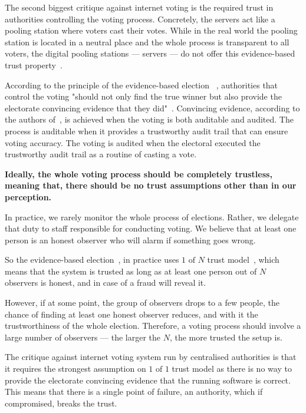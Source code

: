 \documentclass{article}
\begin{document}
The second biggest critique against internet voting is the required trust in authorities controlling the voting process. Concretely, the servers act like a pooling station where voters cast their votes. While in the real world the pooling station is located in a neutral place and the whole process is transparent to all voters, the digital pooling stations — servers — do not offer this evidence-based trust property~\cite{starkEvidenceBasedElections2012}.

According to the principle of the evidence-based election ~\cite{starkEvidenceBasedElections2012}, authorities that control the voting "should not only find the true winner but also provide the electorate convincing evidence that they did"~\cite{appelEvidenceBasedElectionsCreate2019}. Convincing evidence, according to the authors of~\cite{starkEvidenceBasedElections2012}, is achieved when the voting is both auditable and audited. The process is auditable when it provides a trustworthy audit trail that can ensure voting accuracy. The voting is audited when the electoral executed the trustworthy audit trail as a routine of casting a vote.

\textbf{Ideally, the whole voting process should be completely trustless, meaning that, there should be no trust assumptions other than in our perception.}

In practice, we rarely monitor the whole process of elections. Rather, we delegate that duty to staff responsible for conducting voting. We believe that at least one person is an honest observer who will alarm if something goes wrong.

So the evidence-based election~\cite{appelEvidenceBasedElectionsCreate2019}, in practice uses $1 \textrm{ of } N$ trust model~\cite{buterinTrustModels2020}, which means that the system is trusted as long as at least one person out of $N$ observers is honest, and in case of a fraud will reveal it.

However, if at some point, the group of observers drops to a few people, the chance of finding at least one honest observer reduces, and with it the trustworthiness of the whole election. Therefore, a voting process should involve a large number of observers — the larger the $N$, the more trusted the setup is.

The critique against internet voting system run by centralised authorities is that it requires the strongest assumption on $1\textrm{ of }1$ trust model as there is no way to provide the electorate convincing evidence that the running software is correct. This means that there is a single point of failure, an authority, which if compromised, breaks the trust.
\end{document}
